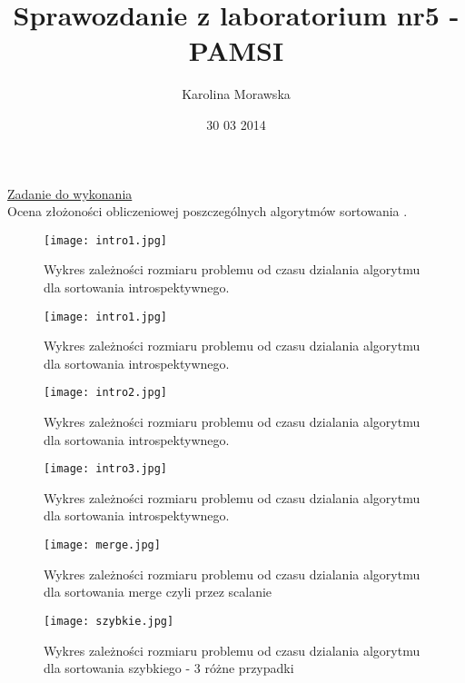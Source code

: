 \documentclass[11pt]{article}
\begin{document}
 \begin{titlepage} 
\title{ Sprawozdanie z laboratorium nr5 -PAMSI} 
\author{Karolina Morawska}
 \date{30 03 2014}
 \maketitle 
\end{titlepage}
 \underline{Zadanie do wykonania}
\\Ocena złożoności obliczeniowej poszczególnych algorytmów sortowania . 
\begin{center}


 \begin{figure}[ht!] 
\centering
 \texttt{[image: intro1.jpg]}
 \caption{Wykres zależności rozmiaru problemu od czasu dzialania algorytmu dla sortowania introspektywnego.  } 
\label{overflow}
 \end{figure}


 \begin{figure}[ht!] 
\centering
 \texttt{[image: intro1.jpg]}
 \caption{Wykres zależności rozmiaru problemu od czasu dzialania algorytmu dla sortowania introspektywnego.} 
\label{overflow}
 \end{figure}

 \begin{figure}[h!] 
\centering
 \texttt{[image: intro2.jpg]}
 \caption{Wykres zależności rozmiaru problemu od czasu dzialania algorytmu dla sortowania introspektywnego.}
\label{overflow}
 \end{figure}

 \begin{figure}[h!] 
\centering
 \texttt{[image: intro3.jpg]}
 \caption{Wykres zależności rozmiaru problemu od czasu dzialania algorytmu dla sortowania introspektywnego.}
\label{overflow}
 \end{figure}

 \begin{figure}[h!] 
\centering
 \texttt{[image: merge.jpg]}
 \caption{Wykres zależności rozmiaru problemu od czasu dzialania algorytmu dla sortowania merge czyli przez scalanie} 
\label{overflow}
 \end{figure}

 \begin{figure}[h] 
\centering
 \texttt{[image: szybkie.jpg]}
 \caption{Wykres zależności rozmiaru problemu od czasu dzialania algorytmu dla sortowania szybkiego - 3 różne przypadki } 
\label{overflow}
 \end{figure}

 \end{center}
\end{document}
